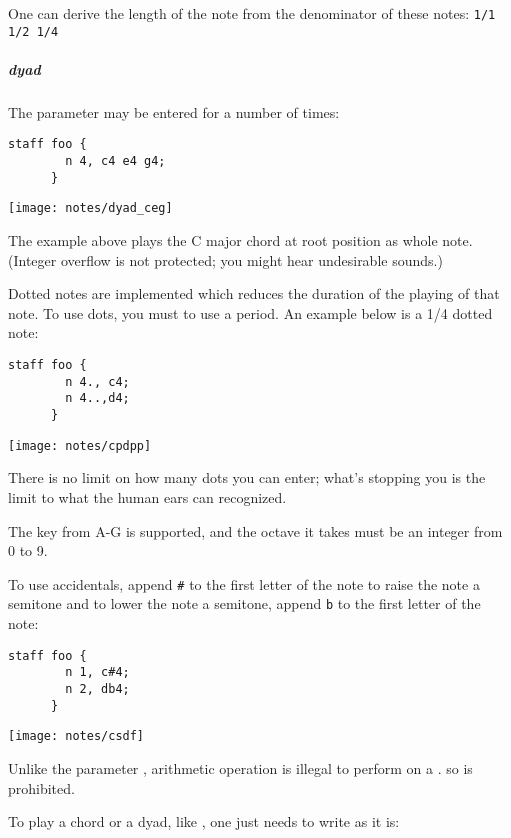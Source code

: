 \np One can derive the length of the note from the denominator of these notes:
\verb+1/1 1/2 1/4+

\subparagraph{dyad}
The parameter  may be entered for a number of times:

\begin{Verbatim}[frame=single]
      staff foo {
        n 4, c4 e4 g4;
      }
\end{Verbatim}

\begin{center}
\texttt{[image: notes/dyad\_ceg]}
\end{center}

\np The example above plays the C major chord at root position as whole note. (Integer overflow is not
protected; you might hear undesirable sounds.)

\np Dotted notes are implemented which reduces the duration of the playing of
that note. To use dots, you must to use a period. An example below is a 1/4 dotted note:
\begin{Verbatim}[frame=single]
      staff foo {
        n 4., c4;
        n 4..,d4;
      }
\end{Verbatim}

\begin{center}
\texttt{[image: notes/cpdpp]}
\end{center}

\np There is no limit on how many dots you can enter; what's stopping you
is the limit to what the human ears can recognized.

\np The key from A-G is supported, and the octave it takes must be an integer
from 0 to 9.

\np To use accidentals, append \verb+#+ to the first letter of the note to raise the note a semitone and to lower the
note a semitone, append \verb+b+ to the first letter of the note:
\begin{Verbatim}[frame=single]
      staff foo {
        n 1, c#4;
        n 2, db4;
      }
\end{Verbatim}

\begin{center}
\texttt{[image: notes/csdf]}
\end{center}

\np Unlike the parameter , arithmetic operation is illegal
to perform on a . so  is prohibited.

\np To play a chord or a dyad, like , one just needs to write as it is:

